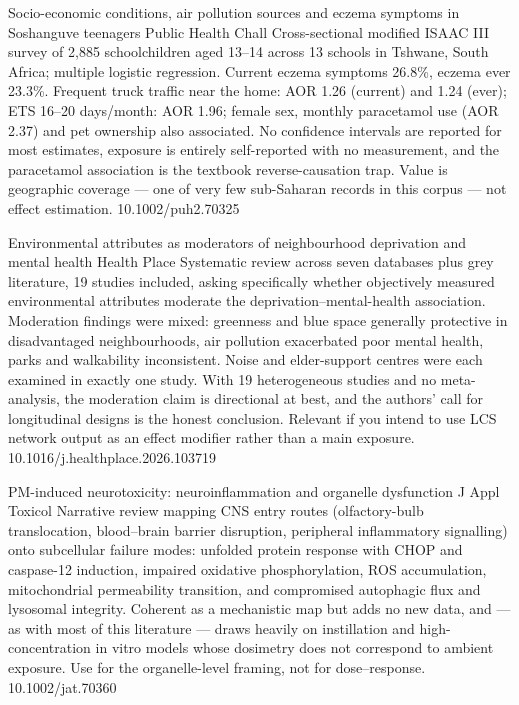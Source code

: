 \documentclass[10pt]{article}
\begin{document}
{Socio-economic conditions, air pollution sources and eczema symptoms in Soshanguve teenagers}
{Public Health Chall}
{Cross-sectional modified ISAAC III survey of 2{,}885 schoolchildren aged 13--14 across
13 schools in Tshwane, South Africa; multiple logistic regression. Current eczema
symptoms 26.8\%, eczema ever 23.3\%. Frequent truck traffic near the home: AOR 1.26
(current) and 1.24 (ever); ETS 16--20 days/month: AOR 1.96; female sex, monthly
paracetamol use (AOR 2.37) and pet ownership also associated. No confidence intervals are
reported for most estimates, exposure is entirely self-reported with no measurement, and
the paracetamol association is the textbook reverse-causation trap. Value is geographic
coverage --- one of very few sub-Saharan records in this corpus --- not effect
estimation.}
{10.1002/puh2.70325}

\clearpage


{Environmental attributes as moderators of neighbourhood deprivation and mental health}
{Health Place}
{Systematic review across seven databases plus grey literature, 19 studies included,
asking specifically whether objectively measured environmental attributes moderate the
deprivation--mental-health association. Moderation findings were mixed: greenness and
blue space generally protective in disadvantaged neighbourhoods, air pollution
exacerbated poor mental health, parks and walkability inconsistent. Noise and
elder-support centres were each examined in exactly one study. With 19 heterogeneous
studies and no meta-analysis, the moderation claim is directional at best, and the
authors' call for longitudinal designs is the honest conclusion. Relevant if you intend
to use LCS network output as an effect modifier rather than a main exposure.}
{10.1016/j.healthplace.2026.103719}

{PM-induced neurotoxicity: neuroinflammation and organelle dysfunction}
{J Appl Toxicol}
{Narrative review mapping CNS entry routes (olfactory-bulb translocation, blood--brain
barrier disruption, peripheral inflammatory signalling) onto subcellular failure modes:
unfolded protein response with CHOP and caspase-12 induction, impaired oxidative
phosphorylation, ROS accumulation, mitochondrial permeability transition, and compromised
autophagic flux and lysosomal integrity. Coherent as a mechanistic map but adds no new
data, and --- as with most of this literature --- draws heavily on instillation and
high-concentration in vitro models whose dosimetry does not correspond to ambient
exposure. Use for the organelle-level framing, not for dose--response.}
{10.1002/jat.70360}
\end{document}
